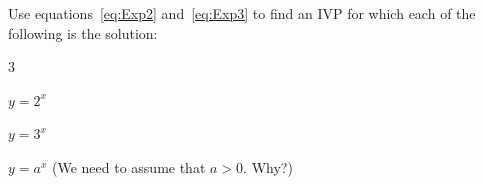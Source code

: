 

\begin{embeddedproblem}{}
  Use equations~\ref{eq:Exp2} and~\ref{eq:Exp3} to find an IVP for
  which each of the following is the solution:
  \begin{enumerate}[label={\bf{}(\alph*)}]
    \begin{multicols}{3}
  \item $y=2^x$
  \item $y=3^x$
  \item $y=a^x$
    (We need to  assume that $a>0.$ Why?)
    \end{multicols}
  \end{enumerate}
\end{embeddedproblem}









